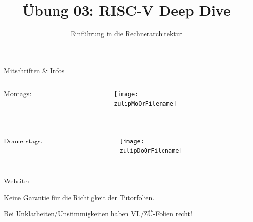 \documentclass[
  german,            %
  aspectratio=169,    %
]{tumbeamer}
\title{Übung 03: RISC-V Deep Dive}
\subtitle{Einführung in die Rechnerarchitektur}
\author{\theAuthorName}
\institute{\theGroupName\\\theSchoolName\\\theUniversityName}
\date{\DTMdisplaydate{2024}{11}{04}{-1}}
\begin{document}
\maketitle

\begin{frame}[c]{Mitschriften \& Infos}{}
  \begin{minipage}[t]{\textwidth}
    \begin{columns}[c]
      \begin{column}{0.8\textwidth}
        Montags: \href{\zulipMo}{\zulipMo}
      \end{column}
      \begin{column}{0.2\textwidth}
        \texttt{[image: \\zulipMoQrFilename]}
      \end{column}
    \end{columns}
  \end{minipage}
  \rule{\textwidth}{0.4pt}
  \begin{minipage}[t]{\textwidth}
    \begin{columns}[c]
      \begin{column}{0.8\textwidth}
        Donnerstags: \href{\zulipDo}{\zulipDo}
      \end{column}
      \begin{column}{0.2\textwidth}
        \texttt{[image: \\zulipDoQrFilename]}
      \end{column}
    \end{columns}
  \end{minipage}
  \ifdefined\myWebsite
  \rule{\textwidth}{0.4pt}
  \centering
  Website: \href{\myWebsite}{\myWebsite}
  \fi
\end{frame}

\begin{frame}[c]{}{}
  \begin{center}
    \LARGE  Keine Garantie für die Richtigkeit der Tutorfolien.

    \Large Bei Unklarheiten/Unstimmigkeiten haben VL/ZÜ-Folien recht!
  \end{center}
\end{frame}
\end{document}
